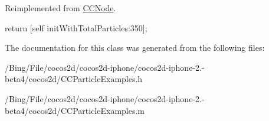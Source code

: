 Reimplemented from \hyperlink{class_c_c_node_ad789cad83aca65c130abd4452d1bc081}{C\-C\-Node}.


\begin{DoxyCode}
{
        return [self initWithTotalParticles:350];
}
\end{DoxyCode}


The documentation for this class was generated from the following files\-:\begin{DoxyCompactItemize}
\item 
/\-Bing/\-File/cocos2d/cocos2d-\/iphone/cocos2d-\/iphone-\/2.-\/beta4/cocos2d/C\-C\-Particle\-Examples.\-h\item 
/\-Bing/\-File/cocos2d/cocos2d-\/iphone/cocos2d-\/iphone-\/2.-\/beta4/cocos2d/C\-C\-Particle\-Examples.\-m\end{DoxyCompactItemize}
